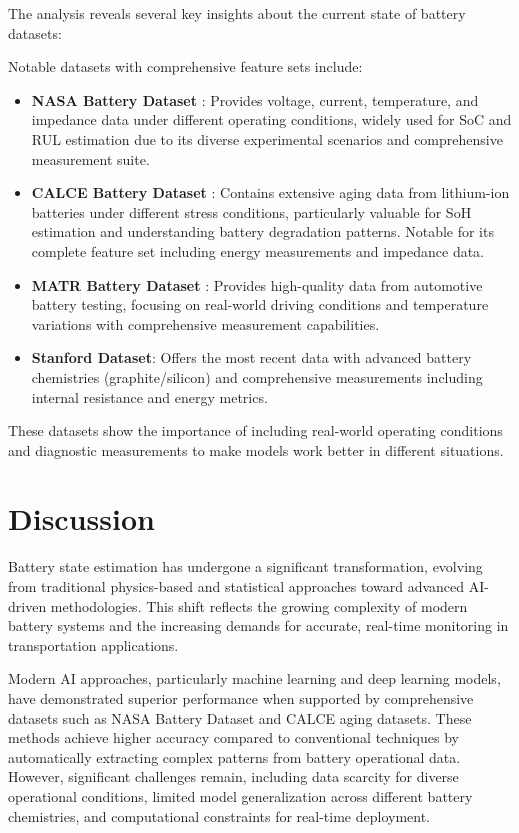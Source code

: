 The analysis reveals several key insights about the current state of battery datasets:

Notable datasets with comprehensive feature sets include:
\begin{itemize}
    \item \textbf{NASA Battery Dataset} \cite{noauthor_nasa_nodate}: Provides voltage, current, temperature, and impedance data under different operating conditions, widely used for SoC and RUL estimation due to its diverse experimental scenarios and comprehensive measurement suite.
    \item \textbf{CALCE Battery Dataset} \cite{CALCE_battery_nodate}: Contains extensive aging data from lithium-ion batteries under different stress conditions, particularly valuable for SoH estimation and understanding battery degradation patterns. Notable for its complete feature set including energy measurements and impedance data.
    \item \textbf{MATR Battery Dataset} \cite{MATR_dataset_nodate}: Provides high-quality data from automotive battery testing, focusing on real-world driving conditions and temperature variations with comprehensive measurement capabilities.
    \item \textbf{Stanford Dataset}: Offers the most recent data with advanced battery chemistries (graphite/silicon) and comprehensive measurements including internal resistance and energy metrics.
\end{itemize}
These datasets show the importance of including real-world operating conditions and diagnostic measurements to make models work better in different situations.


\section{Discussion}

Battery state estimation has undergone a significant transformation, evolving from traditional physics-based and statistical approaches toward advanced AI-driven methodologies. This shift reflects the growing complexity of modern battery systems and the increasing demands for accurate, real-time monitoring in transportation applications.

Modern AI approaches, particularly machine learning and deep learning models, have demonstrated superior performance when supported by comprehensive datasets such as NASA Battery Dataset and CALCE aging datasets. These methods achieve higher accuracy compared to conventional techniques by automatically extracting complex patterns from battery operational data. However, significant challenges remain, including data scarcity for diverse operational conditions, limited model generalization across different battery chemistries, and computational constraints for real-time deployment.
